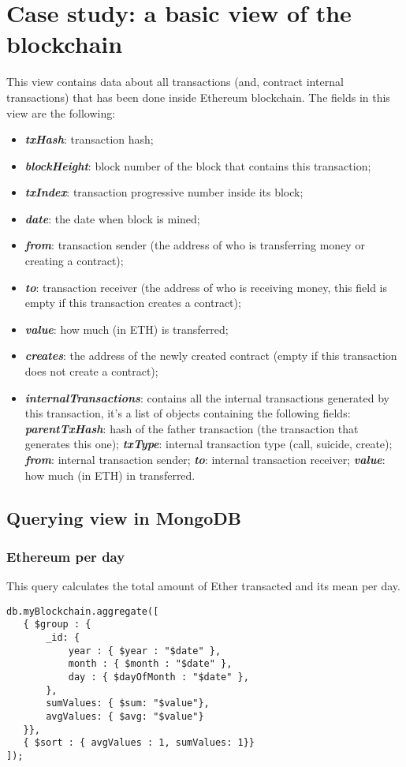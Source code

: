 \section{Case study: a basic view of the blockchain}
This view contains data about all transactions (and, contract internal transactions) that has been done inside Ethereum blockchain. The fields in this view are the following:
\begin{itemize}
    \item \textit{\textbf{txHash}}: transaction hash;
    \item \textit{\textbf{blockHeight}}: block number of the block that contains this transaction;
    \item \textit{\textbf{txIndex}}: transaction progressive number inside its block;
    \item \textit{\textbf{date}}: the date when block is mined;
    \item \textit{\textbf{from}}: transaction sender (the address of who is transferring money or creating a contract);
    \item \textit{\textbf{to}}: transaction receiver (the address of who is receiving money, this field is empty if this transaction creates a contract);
    \item \textit{\textbf{value}}: how much (in ETH) is transferred;
    \item \textit{\textbf{creates}}: the address of the newly created contract (empty if this transaction does not create a contract);
    \item \textit{\textbf{internalTransactions}}: contains all the internal transactions generated by this transaction, it's a list of objects containing the following fields:
        \subitem \textit{\textbf{parentTxHash}}: hash of the father transaction (the transaction that generates this one);
        \subitem \textit{\textbf{txType}}: internal transaction type (call, suicide, create);
        \subitem \textit{\textbf{from}}: internal transaction sender;
        \subitem \textit{\textbf{to}}: internal transaction receiver;
        \subitem \textit{\textbf{value}}: how much (in ETH) in transferred.
\end{itemize}
\subsection{Querying view in MongoDB}
\subsubsection{Ethereum per day}
This query calculates the total amount of Ether transacted and its mean per day.
\begin{center}
\begin{varwidth}{\linewidth}
\begin{verbatim}
db.myBlockchain.aggregate([
   { $group : {
       _id: {
           year : { $year : "$date" },
           month : { $month : "$date" },
           day : { $dayOfMonth : "$date" },
       },
       sumValues: { $sum: "$value"},
       avgValues: { $avg: "$value"}
   }},
   { $sort : { avgValues : 1, sumValues: 1}}
]);
\end{verbatim}
\end{varwidth}
\end{center}
